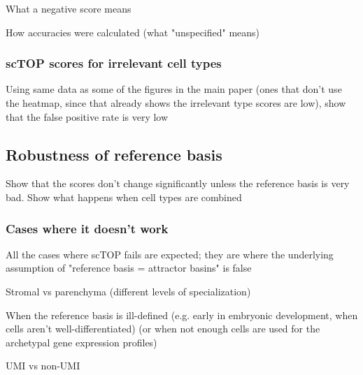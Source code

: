 \documentclass[aps,superscriptaddress, notitlepage,longbibliography]{revtex4-1}
\begin{document}
What a negative score means

How accuracies were calculated (what "unspecified" means)

\subsubsection{scTOP scores for irrelevant cell types}
Using same data as some of the figures in the main paper (ones that don't use the heatmap, since that already shows the irrelevant type scores are low), show that the false positive rate is very low

\subsection{Robustness of reference basis}
Show that the scores don't change significantly unless the reference basis is very bad. Show what happens when cell types are combined

\subsubsection{Cases where it doesn't work}\label{failure_cases}
All the cases where scTOP fails are expected; they are where the underlying assumption of "reference basis = attractor basins" is false

Stromal vs parenchyma (different levels of specialization)

When the reference basis is ill-defined (e.g. early in embryonic development, when cells aren't well-differentiated) (or when not enough cells are used for the archetypal gene expression profiles)

UMI vs non-UMI


\end{document}
